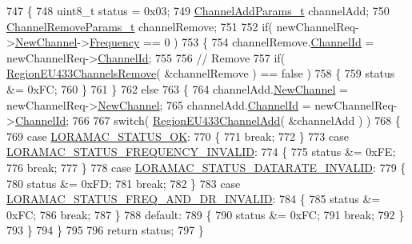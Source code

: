 \begin{DoxyCode}
747 \{
748     uint8\_t status = 0x03;
749     \mbox{\hyperlink{structs_channel_add_params}{ChannelAddParams\_t}} channelAdd;
750     \mbox{\hyperlink{structs_channel_remove_params}{ChannelRemoveParams\_t}} channelRemove;
751 
752     \textcolor{keywordflow}{if}( newChannelReq->\mbox{\hyperlink{structs_new_channel_req_params_afc31493a105479490228fd896b20b45c}{NewChannel}}->\mbox{\hyperlink{structs_channel_params_ade3d190636488dad9a89b19446b7acf1}{Frequency}} == 0 )
753     \{
754         channelRemove.\mbox{\hyperlink{structs_channel_remove_params_ae23f953dc29c360e56a3c856404a3276}{ChannelId}} = newChannelReq->\mbox{\hyperlink{structs_new_channel_req_params_ab072d8ed1ab01d956d5b86a9d0185c3f}{ChannelId}};
755 
756         \textcolor{comment}{// Remove}
757         \textcolor{keywordflow}{if}( \mbox{\hyperlink{group___r_e_g_i_o_n_e_u433_ga8c6f83d1c3aadcbc717551c3d4bc912e}{RegionEU433ChannelsRemove}}( &channelRemove ) == \textcolor{keyword}{false} )
758         \{
759             status &= 0xFC;
760         \}
761     \}
762     \textcolor{keywordflow}{else}
763     \{
764         channelAdd.\mbox{\hyperlink{structs_channel_add_params_afc31493a105479490228fd896b20b45c}{NewChannel}} = newChannelReq->\mbox{\hyperlink{structs_new_channel_req_params_afc31493a105479490228fd896b20b45c}{NewChannel}};
765         channelAdd.\mbox{\hyperlink{structs_channel_add_params_ae23f953dc29c360e56a3c856404a3276}{ChannelId}} = newChannelReq->\mbox{\hyperlink{structs_new_channel_req_params_ab072d8ed1ab01d956d5b86a9d0185c3f}{ChannelId}};
766 
767         \textcolor{keywordflow}{switch}( \mbox{\hyperlink{group___r_e_g_i_o_n_e_u433_ga477a869bd33f0fc4a1104e1a2097418a}{RegionEU433ChannelAdd}}( &channelAdd ) )
768         \{
769             \textcolor{keywordflow}{case} \mbox{\hyperlink{group___l_o_r_a_m_a_c_gga1d18f26b344040b3ec5c3db662919661a03db5fca052313edb3823c014b653a74}{LORAMAC\_STATUS\_OK}}:
770             \{
771                 \textcolor{keywordflow}{break};
772             \}
773             \textcolor{keywordflow}{case} \mbox{\hyperlink{group___l_o_r_a_m_a_c_gga1d18f26b344040b3ec5c3db662919661ae3ea7b89796aed5a320013d9743b2955}{LORAMAC\_STATUS\_FREQUENCY\_INVALID}}:
774             \{
775                 status &= 0xFE;
776                 \textcolor{keywordflow}{break};
777             \}
778             \textcolor{keywordflow}{case} \mbox{\hyperlink{group___l_o_r_a_m_a_c_gga1d18f26b344040b3ec5c3db662919661aa910e51ef7a7cf64c27dd3ffe5eb9d38}{LORAMAC\_STATUS\_DATARATE\_INVALID}}:
779             \{
780                 status &= 0xFD;
781                 \textcolor{keywordflow}{break};
782             \}
783             \textcolor{keywordflow}{case} \mbox{\hyperlink{group___l_o_r_a_m_a_c_gga1d18f26b344040b3ec5c3db662919661a163a1a739baee13607068af42f2e9d30}{LORAMAC\_STATUS\_FREQ\_AND\_DR\_INVALID}}:
784             \{
785                 status &= 0xFC;
786                 \textcolor{keywordflow}{break};
787             \}
788             \textcolor{keywordflow}{default}:
789             \{
790                 status &= 0xFC;
791                 \textcolor{keywordflow}{break};
792             \}
793         \}
794     \}
795 
796     \textcolor{keywordflow}{return} status;
797 \}
\end{DoxyCode}
